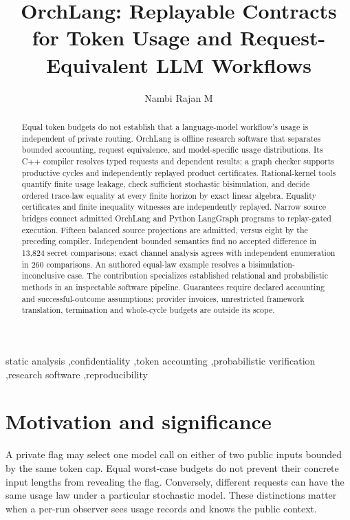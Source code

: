 \documentclass[preprint,12pt, a4paper]{elsarticle}
\begin{document}
\begin{frontmatter}
\title{OrchLang: Replayable Contracts for Token Usage and Request-Equivalent LLM Workflows}
\author{Nambi Rajan M}
\address{Affiliation and postal address to be confirmed by the author}
\begin{abstract}
Equal token budgets do not establish that a language-model workflow's usage is independent of private routing. OrchLang is offline research software that separates bounded accounting, request equivalence, and model-specific usage distributions. Its C++ compiler resolves typed requests and dependent results; a graph checker supports productive cycles and independently replayed product certificates. Rational-kernel tools quantify finite usage leakage, check sufficient stochastic bisimulation, and decide ordered trace-law equality at every finite horizon by exact linear algebra. Equality certificates and finite inequality witnesses are independently replayed. Narrow source bridges connect admitted OrchLang and Python LangGraph programs to replay-gated execution. Fifteen balanced source projections are admitted, versus eight by the preceding compiler. Independent bounded semantics find no accepted difference in 13,824 secret comparisons; exact channel analysis agrees with independent enumeration in 260 comparisons. An authored equal-law example resolves a bisimulation-inconclusive case. The contribution specializes established relational and probabilistic methods in an inspectable software pipeline. Guarantees require declared accounting and successful-outcome assumptions; provider invoices, unrestricted framework translation, termination and whole-cycle budgets are outside its scope.
\end{abstract}
\begin{keyword}
static analysis \sep confidentiality \sep token accounting \sep probabilistic verification \sep research software \sep reproducibility
\end{keyword}
\end{frontmatter}

\section{Motivation and significance}
A private flag may select one model call on either of two public inputs bounded by the same token cap. Equal worst-case budgets do not prevent their concrete input lengths from revealing the flag. Conversely, different requests can have the same usage law under a particular stochastic model. These distinctions matter when a per-run observer sees usage records and knows the public context.
\end{document}

